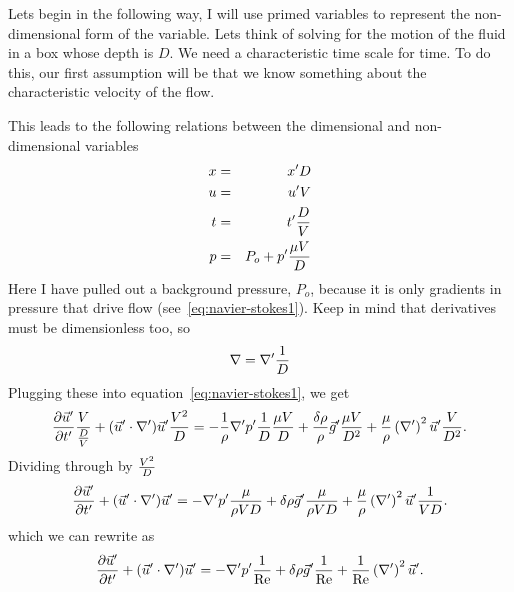 \documentclass[12pt,twoside]{article}
\begin{document}
Lets begin in the following way, I will use primed variables to
represent the non-dimensional form of the variable.   Lets think of solving for
the motion of the fluid in a box whose depth is $D$.   We need a characteristic
time scale for time.  To do this, our first assumption will be that we know
something about the characteristic velocity of the flow.

This leads to the following relations between the dimensional and
non-dimensional variables
\begin{eqnarray}
x & = & x^\prime D \\
u & = & u^\prime {V} \\
t & = & t^\prime {D\over V} \\
p & = & P_o + p^\prime {\mu V\over D}
\end{eqnarray}
Here I have pulled out a background pressure, $P_o$, because it is only
gradients in pressure that drive flow (see~\ref{eq:navier-stokes1}).   Keep in
mind that derivatives must be dimensionless too, so
\begin{equation} 
\nabla = \nabla^\prime {1\over D}
\end{equation}
Plugging these into  equation~\ref{eq:navier-stokes1}, we get
\begin{equation}     
{{\partial \vec u^\prime} \over {\partial t^\prime}}{{V}\over{D\over V}}
 + ( \vec u^\prime \cdot \nabla^\prime ) \vec u^\prime {V^2\over D} 
= -{1\over\rho}\nabla^\prime p^\prime {1\over D} {\mu V\over D}
+ {{\delta\rho}\over\rho}\vec g^\prime {{\mu V}\over D^2} +  
{\mu\over\rho} \left (\nabla^\prime \right )^2 \vec u^\prime {V\over D^2}.
\label{eq:navier-stokes2}
\end{equation}
Dividing through by ${{V^2}\over{D}}$
\begin{equation}      
{{\partial \vec u^\prime} \over {\partial t^\prime}}
 + ( \vec u^\prime \cdot \nabla^\prime ) \vec u^\prime   =
-\nabla^\prime p^\prime {\mu \over {\rho V D}} 
+ \delta\rho \vec g^\prime {\mu \over {\rho V D}} 
+ {\mu\over\rho} \left (\nabla^\prime \right )^2 \vec u^\prime {1\over {V D}}.
\label{eq:navier-stokes-nd}
\end{equation}
which we can rewrite as
\begin{equation}        
{{\partial \vec u^\prime} \over {\partial t^\prime}}
 + ( \vec u^\prime \cdot \nabla^\prime ) \vec u^\prime   
=  -\nabla^\prime p^\prime {1\over {\rm Re}}   
+ \delta\rho \vec g^\prime {1\over {\rm Re}}   
+  {1\over {\rm Re}} \left (\nabla^\prime \right )^2 \vec u^\prime.
\label{eq:navier-stokes-nd2}
\end{equation}
\end{document}
